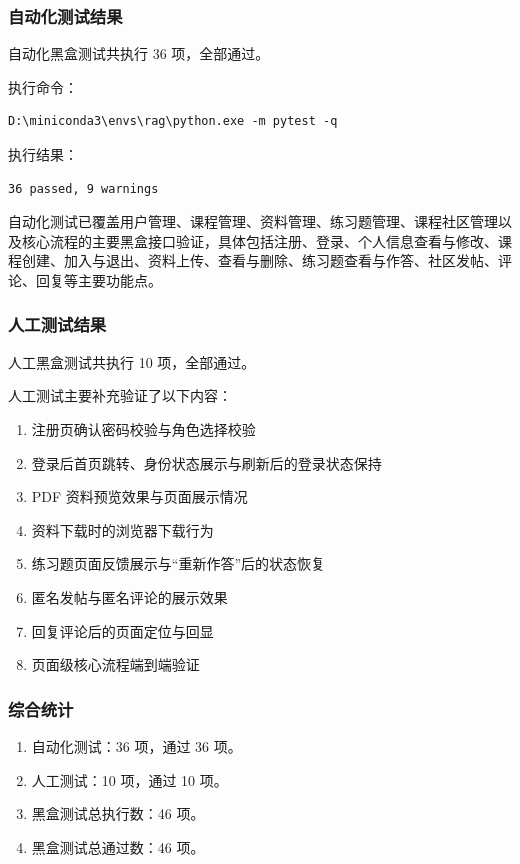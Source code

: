 \documentclass[12pt,a4paper]{ctexart}
\begin{document}
\subsubsection{自动化测试结果}

自动化黑盒测试共执行 36 项，全部通过。

执行命令：

\begin{verbatim}
D:\miniconda3\envs\rag\python.exe -m pytest -q
\end{verbatim}

执行结果：

\begin{verbatim}
36 passed, 9 warnings
\end{verbatim}

自动化测试已覆盖用户管理、课程管理、资料管理、练习题管理、课程社区管理以及核心流程的主要黑盒接口验证，具体包括注册、登录、个人信息查看与修改、课程创建、加入与退出、资料上传、查看与删除、练习题查看与作答、社区发帖、评论、回复等主要功能点。

\subsubsection{人工测试结果}

人工黑盒测试共执行 10 项，全部通过。

人工测试主要补充验证了以下内容：

\begin{enumerate}
  \item 注册页确认密码校验与角色选择校验
  \item 登录后首页跳转、身份状态展示与刷新后的登录状态保持
  \item PDF 资料预览效果与页面展示情况
  \item 资料下载时的浏览器下载行为
  \item 练习题页面反馈展示与“重新作答”后的状态恢复
  \item 匿名发帖与匿名评论的展示效果
  \item 回复评论后的页面定位与回显
  \item 页面级核心流程端到端验证
\end{enumerate}

\subsubsection{综合统计}

\begin{enumerate}
  \item 自动化测试：36 项，通过 36 项。
  \item 人工测试：10 项，通过 10 项。
  \item 黑盒测试总执行数：46 项。
  \item 黑盒测试总通过数：46 项。
\end{enumerate}
\end{document}
